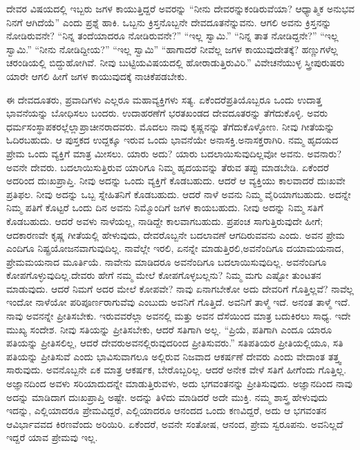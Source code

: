 ದೇವರ ವಿಷಯದಲ್ಲಿ ಇಬ್ಬರು ಜಗಳ ಕಾಯುತ್ತಿದ್ದರೆ ಅವರನ್ನು “ನೀನು ದೇವರನ್ನು\break ಕಂಡಿರುವೆಯಾ? ಆಧ್ಯಾತ್ಮಿಕ ಅನುಭವ ನಿನಗೆ ಆಗಿದೆಯೆ” ಎಂದು ಪ್ರಶ್ನೆ ಹಾಕಿ. ಒಬ್ಬನು ಕ್ರಿಸ್ತನೊಬ್ಬನೇ ದೇವದೂತನೆನ್ನುವನು. ಆಗಲಿ ಅವನು ಕ್ರಿಸ್ತನನ್ನು ನೋಡಿರುವನೇ? “ನಿನ್ನ ತಂದೆಯಾದರೂ ನೋಡಿರುವನೇ?” “ಇಲ್ಲ ಸ್ವಾಮಿ.” “ನಿನ್ನ ತಾತ ನೋಡಿದ್ದನೇ?” “ಇಲ್ಲ ಸ್ವಾಮಿ.” “ನೀನು ನೋಡಿದ್ದೀಯ?” “ಇಲ್ಲ ಸ್ವಾಮಿ” “ಹಾಗಾದರೆ ನೀವೆಲ್ಲ ಜಗಳ ಕಾಯುವು\-ದೇತಕ್ಕೆ? ಹಣ್ಣುಗಳೆಲ್ಲ ಚರಂಡಿಯಲ್ಲಿ ಬಿದ್ದುಹೋಗಿವೆ. ನೀವು ಬುಟ್ಟಿಯ\break ವಿಷಯದಲ್ಲಿ ಹೋರಾಡುತ್ತಿರುವಿರಿ.” ವಿವೇಚನೆಯುಳ್ಳ ಸ್ತ್ರೀಪುರುಷರು ಯಾರೇ ಆಗಲಿ ಹೀಗೆ ಜಗಳ ಕಾಯುವುದಕ್ಕೆ ನಾಚಿಕೆಪಡಬೇಕು.

ಈ ದೇವದೂತರು, ಪ್ರವಾದಿಗಳು ಎಲ್ಲರೂ ಮಹಾವ್ಯಕ್ತಿಗಳು ಸತ್ಯ. ಏಕೆಂದರೆ\break ಪ್ರತಿಯೊಬ್ಬರೂ ಒಂದು ಉದಾತ್ತ ಭಾವನೆಯನ್ನು ಬೋಧಿಸಲು ಬಂದರು. ಉದಾಹರಣೆಗೆ ಭರತಖಂಡದ ದೇವದೂತರನ್ನು ತೆಗೆದುಕೊಳ್ಳಿ. ಅವರು ಧರ್ಮಸಂಸ್ಥಾಪಕರಲ್ಲೆಲ್ಲಾ\break ಪ್ರಾಚೀನರಾದವರು. ಮೊದಲು ನಾವು ಕೃಷ್ಣನನ್ನು ತೆಗೆದುಕೊಳ್ಳೋಣ. ನೀವು ಗೀತೆಯನ್ನು ಓದಿರಬಹುದು. ಆ ಪುಸ್ತಕದ ಉದ್ದಕ್ಕೂ ಇರುವ ಒಂದು ಭಾವನೆಯೇ ಅನಾಸಕ್ತಿ.\break ಅನಾಸಕ್ತರಾಗಿರಿ. ನಮ್ಮ ಹೃದಯದ ಪ್ರೇಮ ಒಂದು ವ್ಯಕ್ತಿಗೆ ಮಾತ್ರ ಮೀಸಲು. ಯಾರು ಅದು? ಯಾರು ಬದಲಾಯಿಸುವುದಿಲ್ಲವೋ ಅವನು. ಅವನಾರು? ಅವನೇ ದೇವರು. ಬದ\-ಲಾಯಿಸುತ್ತಿರುವ ಯಾರಿಗೂ ನಿಮ್ಮ ಹೃದಯವನ್ನು ತೆರುವ ತಪ್ಪು ಮಾಡಬೇಡಿ. ಏಕೆಂದರೆ ಅದರಿಂದ ದುಃಖಪ್ರಾಪ್ತಿ. ನೀವು ಅದನ್ನು ಒಂದು ವ್ಯಕ್ತಿಗೆ ಕೊಡಬಹುದು. ಆದರೆ ಆ ವ್ಯಕ್ತಿಯು ಕಾಲವಾದರೆ ದುಃಖವೇ ಪ್ರತಿಫಲ. ನೀವು ಅದನ್ನು ಒಬ್ಬ ಸ್ನೇಹಿತನಿಗೆ ಕೊಡಬಹುದು. ಆದರೆ ನಾಳೆ ಅವನು ನಿಮ್ಮ ವೈರಿಯಾಗಬಹುದು. ಅದನ್ನೇ ನಿಮ್ಮ ಪತಿಗೆ ಕೊಟ್ಟರೆ ಒಂದು ದಿನ ಅವನು ನಿಮ್ಮೊಂದಿಗೆ ಜಗಳ ಕಾಯಬಹುದು. ನೀವು ಅದನ್ನು ನಿಮ್ಮ ಸತಿಗೆ ಕೊಡಬಹುದು. ಆದರೆ ಅವಳು ನಾಳೆಯಲ್ಲ, ನಾಡಿದ್ದೇ ಕಾಲವಾಗಬಹುದು. ಪ್ರಪಂಚ ಸಾಗುತ್ತಿರುವುದೇ ಹೀಗೆ; ಆದಕಾರಣವೇ ಕೃಷ್ಣ ಗೀತೆಯಲ್ಲಿ ಹೇಳುವುದು, ದೇವರೊಬ್ಬನೇ ಬದಲಾವಣೆ ಆಗದಿರುವವನು ಎಂದು. ಅವನ ಪ್ರೇಮ ಎಂದಿಗೂ ನಿಷ್ಪ್ರಯೋಜನವಾಗುವುದಿಲ್ಲ. ನಾವೆಲ್ಲೇ ಇರಲಿ, ಏನನ್ನೇ ಮಾಡುತ್ತಿರಲಿ,\break ಅವನೆಂದಿಗೂ ದಯಾಮಯನಾದ, ಪ್ರೇಮಮಯನಾದ ಮೂರ್ತಿಯೆ. ನಾವೇನು ಮಾಡಿದರೂ ಅವನೆಂದಿಗೂ ಬದಲಾಯಿಸುವುದಿಲ್ಲ. ಅವನೆಂದಿಗೂ ಕೋಪಗೊಳ್ಳುವುದಿಲ್ಲ.\break ದೇವರು ಹೇಗೆ ನಮ್ಮ ಮೇಲೆ ಕೋಪಗೊಳ್ಳಬಲ್ಲನು? ನಿಮ್ಮ ಮಗು ಎಷ್ಟೋ ತುಂಟತನ ಮಾಡುವುದು. ಆದರೆ ನಿಮಗೆ ಅದರ ಮೇಲೆ ಕೋಪವೇ? ನಾವು ಏನಾಗಬೇಕೋ ಅದು ದೇವರಿಗೆ ಗೊತ್ತಿಲ್ಲವೆ? ನಾವೆಲ್ಲ ಇಂದೋ ನಾಳೆಯೋ ಪರಿಪೂರ್ಣರಾಗುವೆವು ಎಂಬುದು ಅವನಿಗೆ ಗೊತ್ತಿದೆ. ಅವನಿಗೆ ತಾಳ್ಮೆ ಇದೆ. ಅನಂತ ತಾಳ್ಮೆ ಇದೆ. ನಾವು ಅವನನ್ನೇ ಪ್ರೀತಿಸಬೇಕು. ಇರುವವರೆಲ್ಲಾ ಅವನಲ್ಲಿ ಮತ್ತು ಅವನ ದೆಸೆಯಿಂದ ಮಾತ್ರ ಬದುಕಿರಲು ಸಾಧ್ಯ. ಇದೇ ಮುಖ್ಯ ಸಂದೇಶ. ನೀವು ಸತಿಯನ್ನು ಪ್ರೀತಿಸಬೇಕು, ಆದರೆ ಸತಿಗಾಗಿ ಅಲ್ಲ. “ಪ್ರಿಯೆ, ಪತಿಗಾಗಿ ಎಂದೂ ಯಾರೂ ಪತಿಯನ್ನು ಪ್ರೀತಿಸಲಿಲ್ಲ, ಆದರೆ ದೇವರು\break ಅವನಲ್ಲಿರುವುದರಿಂದ ಪ್ರೀತಿಸುವರು.” ಸತಿಪತಿಯರ ಪ್ರೀತಿಯಲ್ಲಿಯೂ, ಸತಿ ಪತಿಯನ್ನು ಪ್ರೀತಿಸುವೆ ಎಂದು ಭಾವಿಸುವಾಗಲೂ ಅಲ್ಲಿರುವ ನಿಜವಾದ ಆಕರ್ಷಣೆ ದೇವರು ಎಂದು ವೇದಾಂತ ತತ್ತ್ವ ಸಾರುವುದು. ಅವನೊಬ್ಬನೇ ಏಕ ಮಾತ್ರ ಆಕರ್ಷಕ, ಬೇರೊಬ್ಬರಿಲ್ಲ. ಆದರೆ ಅನೇಕ ವೇಳೆ ಸತಿಗೆ ಹೀಗೆಂದು ಗೊತ್ತಿಲ್ಲ. ಅಜ್ಞಾನದಿಂದ ಅವಳು ಸರಿಯಾದುದನ್ನೇ ಮಾಡುತ್ತಿರುವಳು, ಅದು ಭಗವಂತನನ್ನು ಪ್ರೀತಿಸುವುದು. ಅಜ್ಞಾನದಿಂದ ನಾವು ಅದನ್ನು ಮಾಡಿದಾಗ ದುಃಖಪ್ರಾಪ್ತಿ ಅಷ್ಟೇ. ಅದನ್ನು ತಿಳಿದು ಮಾಡಿದರೆ ಅದೇ ಮುಕ್ತಿ. ನಮ್ಮ ಶಾಸ್ತ್ರ ಹೇಳುವುದು ಇದನ್ನು, ಎಲ್ಲಿಯಾದರೂ ಪ್ರೇಮವಿದ್ದರೆ, ಎಲ್ಲಿಯಾದರೂ ಆನಂದದ ಒಂದು ಕಣವಿದ್ದರೆ, ಅದು ಆ ಭಗವಂತನ ಆವಿರ್ಭಾವವದ ಕಿರಣವೆಂದು ಅರಿಯಿರಿ. ಏಕೆಂದರೆ, ಅವನೇ ಸಂತೋಷ, ಆನಂದ, ಪ್ರೇಮ ಸ್ವರೂಪನು. ಅವನಿಲ್ಲದೆ ಇದ್ದರೆ ಯಾವ ಪ್ರೇಮವು ಇಲ್ಲ.

